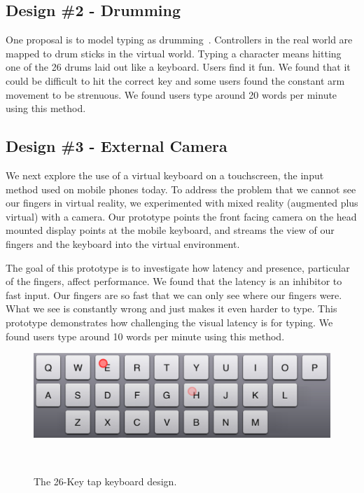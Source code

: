 \subsection{Design \#2 - Drumming}
One proposal is to model typing as drumming~\cite{google_drums}.
Controllers in the real world are mapped to drum sticks in the virtual world.  
Typing a character means hitting one of the 26 drums laid out like a keyboard.
Users find it fun.
We found that it could be difficult to hit the correct key and some users found the constant arm movement to be strenuous.
We found users type around 20 words per minute using this method.

\subsection{Design \#3 - External Camera}

We next explore the use of a virtual keyboard on a touchscreen, the input method used on mobile phones today.
To address the problem that we cannot see our fingers in virtual reality, we experimented with mixed reality (augmented plus virtual) with a camera.
Our prototype points the front facing camera on the head mounted display points at the mobile keyboard, and streams the view of our fingers and the keyboard into the virtual environment. 

The goal of this prototype is to investigate how latency and presence, particular of the fingers, affect performance.
We found that the latency is an inhibitor to fast input.
Our fingers are so fast that we can only see where our fingers were.
What we see is constantly wrong and just makes it even harder to type.
This prototype demonstrates how challenging the visual latency is for typing. 
We found users type around 10 words per minute using this method.


\begin{figure}[!htb]
  \centering

  \includegraphics[width=1\columnwidth]{figures/26-Tap}

  \caption{The 26-Key tap keyboard design.}
  ~\label{fig:multiword}
\end{figure}

